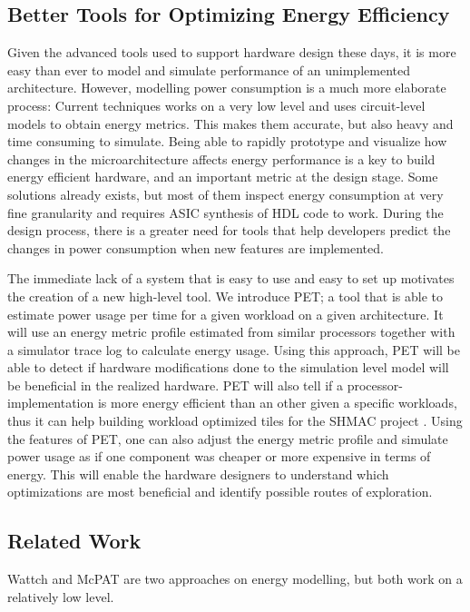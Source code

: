 \subsection{Better Tools for Optimizing Energy Efficiency}

Given the advanced tools used to support hardware design these days, it is more
easy than ever to model and simulate performance of an unimplemented
architecture. However, modelling power consumption is a much more elaborate
process: Current techniques works on a very low level and uses circuit-level
models to obtain energy metrics. This makes them accurate, but also heavy and
time consuming to simulate. Being able to rapidly prototype and visualize how
changes in the microarchitecture affects energy performance is a key to build
energy efficient hardware, and an important metric at the design stage. Some
solutions already exists, but most of them inspect energy consumption at very
fine granularity and requires ASIC synthesis of HDL code to work. During the
design process, there is a greater need for tools that help developers predict
the changes in power consumption when new features are implemented.

The immediate lack of a system that is easy to use and easy to set up motivates
the creation of a new high-level tool. We introduce PET; a tool that is able to
estimate power usage per time for a given workload on a given architecture. It
will use an energy metric profile estimated from similar processors together
with a simulator trace log to calculate energy usage. Using this approach, PET
will be able to detect if hardware modifications done to the simulation level
model will be beneficial in the realized hardware. PET will also tell if a
processor-implementation is more energy efficient than an other given a specific
workloads, thus it can help building workload optimized tiles for the SHMAC
project \cite{shmacwebpage}. Using the features of PET, one can also adjust the
energy metric profile and simulate power usage as if one component was cheaper
or more expensive in terms of energy. This will enable the hardware designers to
understand which optimizations are most beneficial and identify possible routes
of exploration.


\subsection{Related Work}

Wattch \cite{brooks2000wattch} and McPAT \cite{hpmcpat,li2013mcpat} are two
approaches on energy modelling, but both work on a relatively low level.

